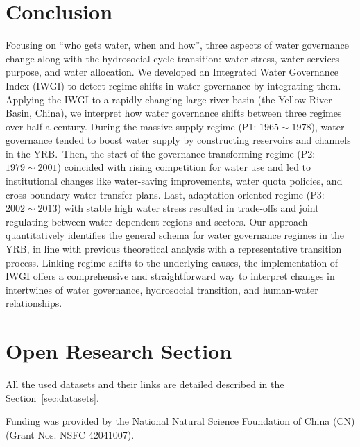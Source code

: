 \documentclass[draft]{../agujournal2019}
\begin{document}
\section{Conclusion}\label{sec13}
Focusing on ``who gets water, when and how'', three aspects of water governance change along with the hydrosocial cycle transition: water stress, water services purpose, and water allocation.
We developed an Integrated Water Governance Index (IWGI) to detect regime shifts in water governance by integrating them. Applying the IWGI to a rapidly-changing large river basin (the Yellow River Basin, China), we interpret how water governance shifts between three regimes over half a century.
During the massive supply regime (P1: $1965 \sim 1978$), water governance tended to boost water supply by constructing reservoirs and channels in the YRB.\
Then, the start of the governance transforming regime (P2: $1979 \sim 2001$) coincided with rising competition for water use and led to institutional changes like water-saving improvements, water quota policies, and cross-boundary water transfer plans.
Last, adaptation-oriented regime (P3: $2002 \sim 2013$) with stable high water stress resulted in trade-offs and joint regulating between water-dependent regions and sectors.
Our approach quantitatively identifies the general schema for water governance regimes in the YRB, in line with previous theoretical analysis with a representative transition process.
Linking regime shifts to the underlying causes, the implementation of IWGI offers a comprehensive and straightforward way to interpret changes in intertwines of water governance, hydrosocial transition, and human-water relationships.
























\section*{Open Research Section}
All the used datasets and their links are detailed described in the Section~\ref{sec:datasets}.



\acknowledgments
Funding was provided by the National Natural Science Foundation of China (CN) (Grant Nos. NSFC 42041007).


\end{document}
